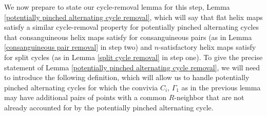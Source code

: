 \documentclass{amsart}
\theoremstyle{definition}
\theoremstyle{remark}
\numberwithin{equation}{section}
\begin{document}
We now prepare to state our cycle-removal lemma for this step, Lemma \ref{potentially pinched alternating cycle removal}, which will say that flat helix maps satisfy a similar cycle-removal property for potentially pinched alternating cycles that consanguineous helix maps satisfy for consanguineous pairs (as in Lemma \ref{consanguineous pair removal} in step two) and $n$-satisfactory helix maps satisfy for split cycles (as in Lemma \ref{split cycle removal} in step one). To give the precise statement of Lemma \ref{potentially pinched alternating cycle removal}, we will need to introduce the following definition, which will allow us to handle potentially pinched alternating cycles for which the convivia $C_{i}$, $\Gamma_{1}$ as in the previous lemma may have additional pairs of points with a common $R$-neighbor that are not already accounted for by the potentially pinched alternating cycle.
\end{document}
